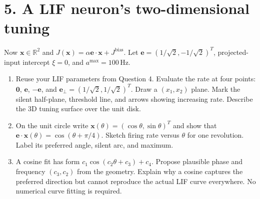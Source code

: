 \documentclass[11pt,letterpaper]{article}
\newcommand{\R}{\mathbb{R}}
\newcommand{\vct}[1]{\boldsymbol{#1}}
\begin{document}
\section*{5. A LIF neuron's two-dimensional tuning}
Now \(\vct{x}\in\R^2\) and \(J(\vct{x})=\alpha\vct{e}\cdot\vct{x}+J^{\mathrm{bias}}\). Let \(\vct{e}=(1/\sqrt2,-1/\sqrt2)^T\), projected-input intercept \(\xi=0\), and \(a^{\max}=100\,\mathrm{Hz}\).
\begin{enumerate}[label=\textbf{5\alph*.}]
\item Reuse your LIF parameters from Question 4. Evaluate the rate at four points:
\(\vct{0}\), \(\vct{e}\), \(-\vct{e}\), and \(\vct{e}_{\perp}=(1/\sqrt2,1/\sqrt2)^T\).
Draw a \((x_1,x_2)\) plane. Mark the silent half-plane, threshold line, and arrows showing increasing rate. Describe the 3D tuning surface over the unit disk.
\item On the unit circle write \(\vct{x}(\theta)=(\cos\theta,\sin\theta)^T\) and show that \(\vct{e}\cdot\vct{x}(\theta)=\cos(\theta+\pi/4)\). Sketch firing rate versus \(\theta\) for one revolution. Label its preferred angle, silent arc, and maximum.
\item A cosine fit has form \(c_1\cos(c_2\theta+c_3)+c_4\). Propose plausible phase and frequency \((c_3,c_2)\) from the geometry. Explain why a cosine captures the preferred direction but cannot reproduce the actual LIF curve everywhere. No numerical curve fitting is required.
\end{enumerate}
\end{document}
